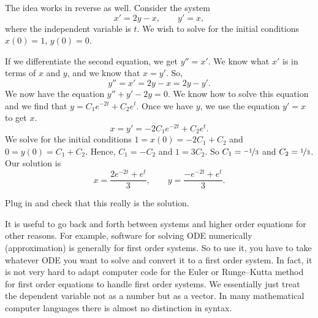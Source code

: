 \begin{example}
The idea works in reverse as well.  Consider 
the system
\begin{equation*}
x' = 2y-x , \qquad
y' = x, 
\end{equation*}
where the independent variable is $t$.  We wish to solve for the initial
conditions $x(0) = 1$, $y(0) =0$.
\end{example}

\begin{exampleSol}
If we differentiate the second equation, we get
$y''=x'$.  We know what $x'$ is in terms of $x$ and $y$, and
we know that $x=y'$.  So,
\begin{equation*}
y'' = x' = 2y-x = 2y-y' .
\end{equation*}
We now have the equation $y''+y'-2y = 0$.  We know how to solve this
equation and we find that $y = C_1 e^{-2t} + C_2 e^t$.  Once we have $y$,
we use the equation $y' = x$ to get $x$.
\begin{equation*}
x = y' = -2 C_1 e^{-2t} + C_2 e^t .
\end{equation*}
We solve for the initial conditions $1 = x(0) = -2 C_1 + C_2$
and $0 = y(0) = C_1 + C_2$.  Hence, $C_1 = -C_2$ and $1 = 3C_2$.
So $C_1 = \nicefrac{-1}{3}$ and $C_2 = \nicefrac{1}{3}$.  Our solution is
\begin{equation*}
x = \frac{2e^{-2t} + e^t}{3} ,\qquad
y = \frac{-e^{-2t} + e^t}{3} .
\end{equation*}
\end{exampleSol}

\begin{exercise}
Plug in and check that this really is the solution.
\end{exercise}

It is useful to go back and forth between systems and higher order equations
for other reasons.  For example, software for solving ODE numerically
(approximation) is generally for first order systems.  So to use it,
you have to take whatever ODE you want to solve and convert it to a first
order system.  In fact, it is not very hard
to adapt computer code for the Euler or Runge--Kutta method for first order equations to
handle first
order systems.  We essentially just treat the dependent variable not as
a number but as a vector.  In many mathematical computer languages there is
almost no distinction in syntax.


